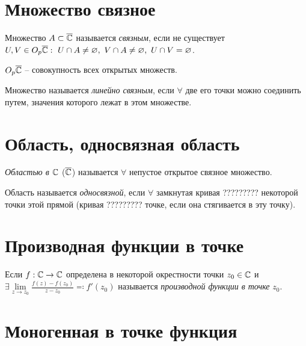 \section{Множество связное}

\begin{definition}
	Множество $A \subset \overline{\mathbb{C}}$ называется \emph{связным}, если не существует $U,V \in O_p \overline{\mathbb{C}}: \ U \cap A \ne \varnothing, \ V \cap A \ne \varnothing, \ U \cap V = \varnothing$.

	\begin{notation}
		$O_p \overline{\mathbb{C}}$ -- совокупность всех открытых множеств.
	\end{notation}
\end{definition}

\begin{definition}
	Множество называется \emph{линейно связным}, если $\forall $ две его точки можно соединить путем, значения которого лежат в этом множестве.
\end{definition}

\section{Область, односвязная область}

\begin{definition}
	\emph{Областью в $\mathbb{C}$} ($\overline{\mathbb{C}}$) называется $\forall $ непустое открытое связное множество.

	Область называется \emph{односвязной}, если $\forall $ замкнутая кривая ????????? некоторой точки этой прямой (кривая ????????? точке, если она стягивается в эту точку).
\end{definition}

\section{Производная функции в точке}

\begin{definition}
	Если $f: \mathbb{C} \rightarrow \mathbb{C}$ определена в некоторой окрестности точки $z_0 \in \mathbb{C}$ и $\exists \underset{z \rightarrow z_0}{\lim}\frac{f(z) - f(z_0)}{z - z_0} \eqqcolon f'(z_0)$ называется \emph{производной функции в точке} $z_0$.
\end{definition}

\newpage

\section{Моногенная в точке функция}

